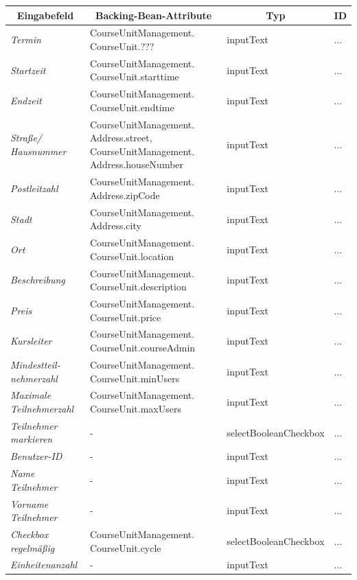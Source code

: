 \begin{itemize}
				\begin{center}
					\begin{longtable}{|p{3cm} |p{5cm} | p{4cm}|p{3cm}|}
						
						\hline \multicolumn{1}{|c|}{\textbf{Eingabefeld}} & \multicolumn{1}{|c|}{\textbf{Backing-Bean-Attribute}} & \multicolumn{1}{|c|}{\textbf{Typ}}  &  \multicolumn{1}{|c|}{\textbf{ID}} \\ \hline
						\endfirsthead
						\hline
						\endlastfoot
						\textit{Termin} & CourseUnitManagement. CourseUnit.??? & inputText & ... \\ \hline
						\textit{Startzeit} & CourseUnitManagement. CourseUnit.starttime & inputText & ... \\ \hline
						\textit{Endzeit} & CourseUnitManagement. CourseUnit.endtime & inputText & ... \\ \hline
						\textit{Straße/ Hausnummer} & CourseUnitManagement. Address.street, CourseUnitManagement. Address.houseNumber & inputText & ...\\ \hline
						\textit{Postleitzahl} & CourseUnitManagement. Address.zipCode & inputText & ... \\ \hline
						\textit{Stadt} & CourseUnitManagement. Address.city & inputText & ... \\ \hline
						\textit{Ort} & CourseUnitManagement. CourseUnit.location & inputText & ... \\ \hline
						\textit{Beschreibung} & CourseUnitManagement. CourseUnit.description & inputText & ...\\ \hline
						\textit{Preis} & CourseUnitManagement. CourseUnit.price & inputText & ... \\ \hline
						\textit{Kursleiter} & CourseUnitManagement. CourseUnit.courseAdmin & inputText & ... \\ \hline
						\textit{Mindestteil- nehmerzahl} & CourseUnitManagement. CourseUnit.minUsers & inputText & ... \\ \hline
						\textit{Maximale Teilnehmerzahl} & CourseUnitManagement. CourseUnit.maxUsers & inputText & ... \\ \hline
						\textit{Teilnehmer markieren} & - & selectBooleanCheckbox & ... \\ \hline
						\textit{Benutzer-ID} & - & inputText & ... \\ \hline
						\textit{Name Teilnehmer} & - & inputText & ... \\ \hline
						\textit{Vorname Teilnehmer} & - & inputText & ... \\ \hline
						\textit{Checkbox regelmäßig} & CourseUnitManagement. CourseUnit.cycle & selectBooleanCheckbox & ... \\ \hline
						\textit{Einheitenanzahl} & - & inputText & ... \\ \hline
					\end{longtable}
				\end{center}
				

\end{itemize}

